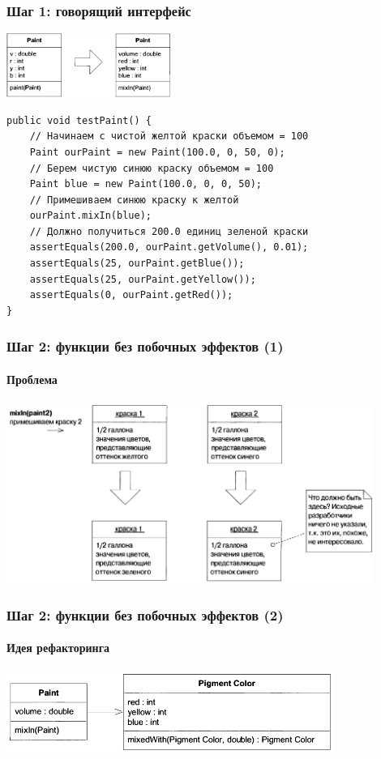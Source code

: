 \documentclass[xetex,mathserif,serif]{beamer}
\begin{document}
	\begin{frame}[fragile]
		\frametitle{Шаг 1: говорящий интерфейс}
		\begin{center}
			\includegraphics[width=0.4\textwidth]{informativeInterfaceForPaint.png}
		\end{center}
		\begin{footnotesize}
			\begin{verbatim}
public void testPaint() {
    // Начинаем с чистой желтой краски объемом = 100
    Paint ourPaint = new Paint(100.0, 0, 50, 0);
    // Берем чистую синюю краску объемом = 100
    Paint bluе = new Paint(100.0, 0, 0, 50);
    // Примешиваем синюю краску к желтой
    ourPaint.mixIn(blue); 
    // Должно получиться 200.0 единиц зеленой краски
    assertEquals(200.0, ourPaint.getVolume(), 0.01);
    assertEquals(25, ourPaint.getBlue());
    assertEquals(25, ourPaint.getYellow());
    assertEquals(0, ourPaint.getRed());
}
			\end{verbatim}
		\end{footnotesize}
\end{frame}

	\begin{frame}
		\frametitle{Шаг 2: функции без побочных эффектов (1)}
		\framesubtitle{Проблема}
		\begin{center}
			\includegraphics[width=0.9\textwidth]{mixinSideEffects.png}
		\end{center}
	\end{frame}

	\begin{frame}
		\frametitle{Шаг 2: функции без побочных эффектов (2)}
		\framesubtitle{Идея рефакторинга}
		\begin{center}
			\includegraphics[width=0.8\textwidth]{pigmentColor.png}
		\end{center}
	\end{frame}
\end{document}
